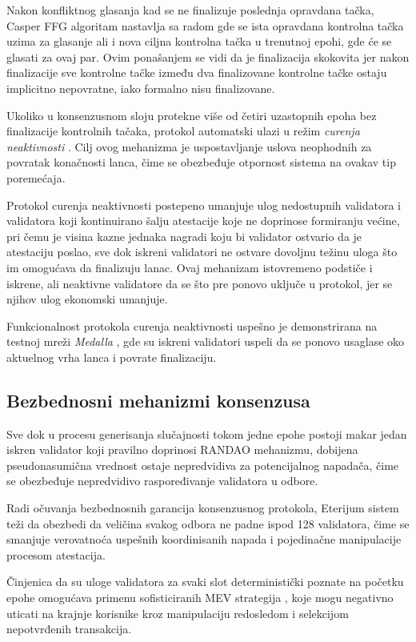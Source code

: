 Nakon konfliktnog glasanja kad se ne finalizuje poslednja opravdana tačka, Casper FFG algoritam nastavlja sa radom gde se ista opravdana kontrolna tačka uzima za glasanje ali i nova ciljna kontrolna tačka u trenutnoj epohi, gde će se glasati za ovaj par. Ovim ponašanjem se vidi da je finalizacija skokovita jer nakon finalizacije sve kontrolne tačke između dva finalizovane kontrolne tačke ostaju implicitno nepovratne, iako formalno nisu finalizovane.

Ukoliko u konsenzusnom sloju protekne više od četiri uzastopnih epoha bez finalizacije kontrolnih tačaka, protokol automatski ulazi u režim \textit{curenja neaktivnosti} . Cilj ovog mehanizma je uspostavljanje uslova neophodnih za povratak konačnosti lanca, čime se obezbeđuje otpornost sistema na ovakav tip poremećaja.

Protokol curenja neaktivnosti postepeno umanjuje ulog nedostupnih validatora i validatora koji kontinuirano šalju atestacije koje ne doprinose formiranju većine, pri čemu je visina kazne jednaka nagradi koju bi validator ostvario da je atestaciju poslao, sve dok iskreni validatori ne ostvare dovoljnu težinu uloga što im omogućava da finalizuju lanac. Ovaj mehanizam istovremeno podstiče i iskrene, ali neaktivne validatore da se što pre ponovo uključe u protokol, jer se njihov ulog ekonomski umanjuje.

Funkcionalnost protokola curenja neaktivnosti uspešno je demonstrirana na testnoj mreži \textit{Medalla} \cite{solmonteanalysis}, gde su iskreni validatori uspeli da se ponovo usaglase oko aktuelnog vrha lanca i povrate finalizaciju.

\subsection{Bezbednosni mehanizmi konsenzusa}
Sve dok u procesu generisanja slučajnosti tokom jedne epohe postoji makar jedan iskren validator koji pravilno doprinosi RANDAO mehanizmu, dobijena pseudonasumična vrednost ostaje nepredvidiva za potencijalnog napadača, čime se obezbeđuje nepredvidivo raspoređivanje validatora u odbore.

Radi očuvanja bezbednosnih garancija konsenzusnog protokola, Eterijum sistem teži da obezbedi da veličina svakog odbora ne padne ispod 128 validatora, čime se smanjuje verovatnoća uspešnih koordinisanih napada i pojedinačne manipulacije procesom atestacija.

Činjenica da su uloge validatora za svaki slot deterministički poznate na početku epohe omogućava primenu sofisticiranih MEV strategija \cite{malkhi2022maximal}, koje mogu negativno uticati na krajnje korisnike kroz manipulaciju redosledom i selekcijom nepotvrđenih transakcija.

